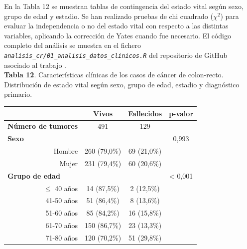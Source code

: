 En la Tabla 12 se muestran tablas de contingencia del estado vital según sexo, grupo de edad y estadio. Se han realizado pruebas de chi cuadrado ($\chi^2$) \cite{Pearson1900} para evaluar la independencia o no del estado vital con respecto a las distintas variables, aplicando la corrección de Yates \cite{Yates1934} cuando fue necesario. El código completo del análisis se muestra en el fichero \textit{\texttt{analisis\_cr/01\_analisis\_datos\_clinicos.R}} del repositorio de GitHub asociado al trabajo \cite{Redondo-Sanchez2020}.\\

\textbf{Tabla 12}. Características clínicas de los casos de cáncer de colon-recto. Distribución de  estado vital según sexo, grupo de edad, estadio y diagnóstico primario.

\begin{table}[H]
	\centering
	\begin{tabular}{rccc}
		\cline{2-4}
		\multicolumn{1}{l}{}                              & \textbf{Vivos} & \textbf{Fallecidos} & \textbf{p-valor} \\ \hline
		\multicolumn{1}{l}{\textbf{Número de tumores}}    & 491            & 129                 &                  \\ \hline
		\multicolumn{1}{l}{\textbf{Sexo}}                 &                &                     & 0,993            \\
		Hombre                                            & 260 (79,0\%)     & 69 (21,0\%)           &                  \\
		Mujer                                             & 231 (79,4\%)   & 60 (20,6\%)         &                  \\ \hline
		\multicolumn{1}{l}{\textbf{Grupo de edad}}        &                &                     & \textless{} 0,001 \\
		$\leq$ 40 años                                         & 14 (87,5\%)    & 2 (12,5\%)          &                  \\
		41-50 años                                        & 51 (86,4\%)    & 8 (13,6\%)          &                  \\
		51-60 años                                        & 85 (84,2\%)    & 16 (15,8\%)         &                  \\
		61-70 años                                        & 150 (86,7\%)   & 23 (13,3\%)         &                  \\
		71-80 años                                        & 120 (70,2\%)   & 51 (29,8\%)         &                  \\

\end{tabular}
\end{table}
